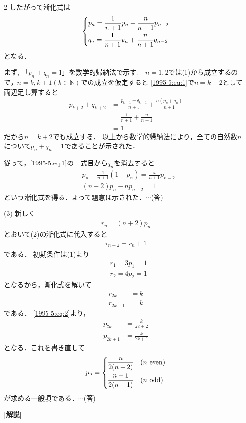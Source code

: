 \documentclass[../../../../main.tex]{subfiles}
\begin{document}
\begin{multicols}{2}
    したがって漸化式は
    \begin{align}
        \begin{dcases}
            p_n = \frac{1}{n+1} p_n + \frac{n}{n+1} p_{n-2} \\
            q_n = \frac{1}{n+1} p_n + \frac{n}{n+1} q_{n-2}
        \end{dcases} \label{1995-5:eq:1}
    \end{align}
    となる．

    まず, 「$p_n+q_n=1$」を数学的帰納法で示す．
    $n=1,2$では(1)から成立するので，$n=k, k+1 (k \in \mathbb{N})$での成立を仮定すると
    \cref{1995-5:eq:1}で$n=k+2$として両辺足し算すると
    \begin{align*}
        p_{k+2} + q_{k+2}
         & = \frac{p_{k+1}+q_{k+1}}{n+1} + \frac{n(p_{n}+q_{n})}{n+1} \\
         & = \frac{1}{n+1} + \frac{n}{n+1}                            \\
         & = 1
    \end{align*}
    だから$n=k+2$でも成立する．
    以上から数学的帰納法により，全ての自然数$n$について$p_n+q_n=1$であることが示された．

    従って，\cref{1995-5:eq:1}の一式目から$q_n$を消去すると
    \begin{align*}
         & p_n - \frac{1}{n+1}(1-p_n) = \frac{n}{n+1}p_{n-2} \\
         & (n+2)p_n - n p_{n-2} = 1
    \end{align*}
    という漸化式を得る．よって題意は示された．$\cdots$(答)

    \vspace{10pt}
    (3)
    新しく
    \begin{align}
        r_n = (n+2)p_n  \label{1995-5:eq:2}
    \end{align}
    とおいて(2)の漸化式に代入すると
    \begin{align*}
        r_{n+2} = r_{n}+1
    \end{align*}
    である．
    初期条件は(1)より
    \begin{align*}
         & r_1 = 3 p_1 = 1 \\
         & r_2 = 4 p_2 = 1
    \end{align*}
    となるから，漸化式を解いて
    \begin{align*}
        r_{2k}   & = k \\
        r_{2k-1} & = k
    \end{align*}
    である．
    \cref{1995-5:eq:2}より，
    \begin{align*}
        p_{2k}   & = \frac{k}{2k+2} \\
        p_{2k+1} & = \frac{k}{2k+1}
    \end{align*}
    となる．これを書き直して
    \begin{align*}
        p_n =
        \begin{dcases}
            \frac{n}{2(n+2)}   & (n \text{ even}) \\
            \frac{n-1}{2(n+1)} & (n \text{ odd})
        \end{dcases}
    \end{align*}
    が求める一般項である．$\cdots$(答)

    \vspace{10pt}
    {\bf[解説]}

    \newpage
\end{multicols}
\end{document}
